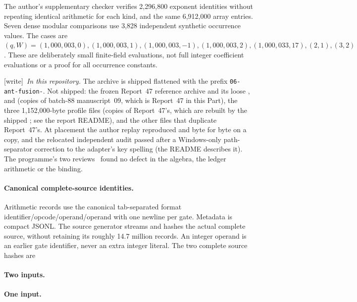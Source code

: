 \documentclass[11pt,letterpaper]{article}
\theoremstyle{definition}\newtheorem{definition}[theorem]{Definition}
\theoremstyle{remark}\newtheorem{remark}[theorem]{Remark}
\newcommand{\wtag}{\textup{[write]}}
\begin{document}
The author's supplementary checker verifies 2,296,800 exponent identities without repeating identical arithmetic for each kind, and the same 6,912,000 array entries. Seven dense modular comparisons use 3,828 independent synthetic occurrence values. The cases are $(q,W)=(1,000,003,0),(1,000,003,1),(1,000,003,-1),(1,000,003,2),(1,000,033,17),(2,1),(3,2)$. These are deliberately small finite-field evaluations, not full integer coefficient evaluations or a proof for all occurrence constants.

{\small\wtag\ \emph{In this repository.} The archive is shipped flattened
with the prefix \texttt{06-ant-fusion-}. Not shipped: the frozen Report~47
reference archive and its loose ,
 and  (copies of batch-88 manuscript~09,
which is Report~47 in this Part), the three 1,152,000-byte profile files
 (copies of Report~47's, which are
rebuilt by the shipped ;
see the report README), and the other files that duplicate Report~47's. At
placement the author replay reproduced  and
 byte for byte on a copy, and the relocated
independent audit passed after a Windows-only path-separator correction to
the adapter's key spelling (the README describes it). The programme's two
reviews~\cite{ptr:w:rev4748,ptr:w:share48} found no defect in the algebra,
the ledger arithmetic or the binding.\par}

\paragraph{Canonical complete-source identities.}
Arithmetic records use the canonical tab-separated format identifier/opcode/operand/operand with one newline per gate. Metadata is compact JSONL. The source generator streams and hashes the actual complete source, without retaining its roughly 14.7 million records. An integer operand is an earlier gate identifier, never an extra integer literal. The two complete source hashes are
\paragraph{Two inputs.} 
\paragraph{One input.} 
\end{document}
